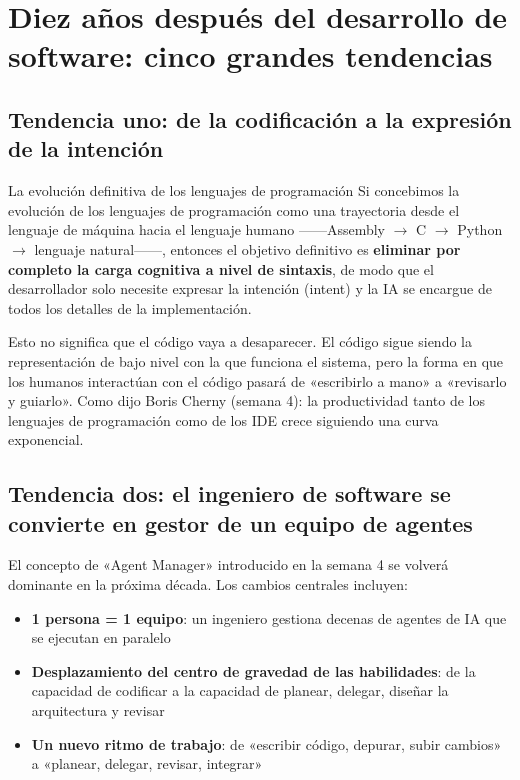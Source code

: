\documentclass[a4paper]{article}
\begin{document}
\section{Diez años después del desarrollo de software: cinco grandes tendencias}

\subsection{Tendencia uno: de la codificación a la expresión de la intención}

\begin{importantbox}{La evolución definitiva de los lenguajes de programación}
Si concebimos la evolución de los lenguajes de programación como una trayectoria desde el lenguaje de máquina hacia el lenguaje humano ——Assembly $\rightarrow$ C $\rightarrow$ Python $\rightarrow$ lenguaje natural——, entonces el objetivo definitivo es \textbf{eliminar por completo la carga cognitiva a nivel de sintaxis}, de modo que el desarrollador solo necesite expresar la intención (intent) y la IA se encargue de todos los detalles de la implementación.
\end{importantbox}

Esto no significa que el código vaya a desaparecer. El código sigue siendo la representación de bajo nivel con la que funciona el sistema, pero la forma en que los humanos interactúan con el código pasará de «escribirlo a mano» a «revisarlo y guiarlo». Como dijo Boris Cherny (semana 4): la productividad tanto de los lenguajes de programación como de los IDE crece siguiendo una curva exponencial.

\subsection{Tendencia dos: el ingeniero de software se convierte en gestor de un equipo de agentes}

El concepto de «Agent Manager» introducido en la semana 4 se volverá dominante en la próxima década. Los cambios centrales incluyen:

\begin{itemize}
    \item \textbf{1 persona = 1 equipo}: un ingeniero gestiona decenas de agentes de IA que se ejecutan en paralelo
    \item \textbf{Desplazamiento del centro de gravedad de las habilidades}: de la capacidad de codificar a la capacidad de planear, delegar, diseñar la arquitectura y revisar
    \item \textbf{Un nuevo ritmo de trabajo}: de «escribir código, depurar, subir cambios» a «planear, delegar, revisar, integrar»
\end{itemize}
\end{document}
